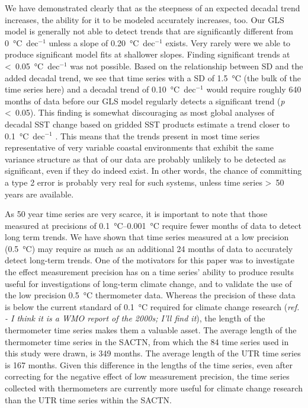 \documentclass[]{ametsoc}
\begin{document}
We have demonstrated clearly that as the steepness of an expected decadal trend increases, the ability for it to be modeled accurately increases, too. Our GLS model is generally not able to detect trends that are significantly different from \SI{0}{\degreeCelsius}~dec$^{-1}$ unless a slope of \SI{0.20}{\degreeCelsius}~dec$^{-1}$ exists. Very rarely were we able to produce significant model fits at shallower slopes. Finding significant trends at \textless~\SI{0.05}{\degreeCelsius}~dec$^{-1}$ was not possible. Based on the relationship between SD and the added decadal trend, we see that time series with a SD of \SI{1.5}{\degreeCelsius} (the bulk of the time series here) and a decadal trend of \SI{0.10}{\degreeCelsius}~dec$^{-1}$ would require roughly 640 months of data before our GLS model regularly detects a significant trend (\emph{p} \textless~0.05). This finding is somewhat discouraging as most global analyses of decadal SST change based on gridded SST products estimate a trend closer to \SI{0.1}{\degreeCelsius}~dec$^{-1}$ \citep[e.g.][]{IPCC2013}. This means that the trends present in most time series representative of very variable coastal environments that exhibit the same variance structure as that of our data are probably unlikely to be detected as significant, even if they do indeed exist. In other words, the chance of committing a type 2 error is probably very real for such systems, unless time series \textgreater~50 years are available.

As 50 year time series are very scarce, it is important to note that those measured at precisions of \SIrange{0.1}{0.001}{\degreeCelsius} require fewer months of data to detect long term trends. We have shown that time series measured at a low precision (\SI{0.5}{\degreeCelsius}) may require as much as an additional 24 months of data to accurately detect long-term trends. One of the motivators for this paper was to investigate the effect measurement precision has on a time series' ability to produce results useful for investigations of long-term climate change, and to validate the use of the low precision \SI{0.5}{\degreeCelsius} thermometer data. Whereas the precision of these data is below the current standard of \SI{0.1}{\degreeCelsius} required for climate change research (\emph{ref. - I think it is a WMO report of the 2000s; I'll find it}), the length of the thermometer time series makes them a valuable asset. The average length of the thermometer time series in the SACTN, from which the 84 time series used in this study were drawn, is 349 months. The average length of the UTR time series is 167 months. Given this difference in the lengths of the time series, even after correcting for the negative effect of low measurement precision, the time series collected with thermometers are currently more useful for climate change research than the UTR time series within the SACTN.
\end{document}
